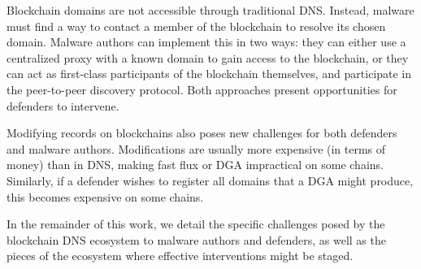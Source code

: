 Blockchain domains are not accessible through traditional DNS. Instead, 
malware 
must find a way to contact a member of the blockchain to resolve its chosen 
domain. Malware authors 
can implement this in two ways: they can either use a centralized proxy with a 
known domain to gain 
access to the blockchain, or they can act as first-class participants of the 
blockchain themselves, 
and participate in the peer-to-peer discovery protocol. Both approaches 
present opportunities for 
defenders to intervene. 

Modifying records on blockchains also poses new challenges for both defenders 
and malware authors. 
Modifications are usually more expensive (in terms of money) than in DNS, 
making fast flux or DGA 
impractical on some chains. Similarly, if a defender wishes to register 
all domains that a DGA 
might produce, this becomes expensive on some chains.

In the remainder of this work, we detail the specific challenges posed by the 
blockchain DNS 
ecosystem to malware authors and defenders, as well as the pieces of the 
ecosystem where 
effective interventions might be staged.